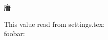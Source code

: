 \documentclass[a4paper,twoside]{book}
\begin{document}
{\mktsFontsDejavuserifregular\mktsSampletexten}\par
{\mktsFontsDejavuserifregular\mktsSampletextzh}\par
{\mktsFontsSunexta{}唐\mktsSampletextzh}\par
This value read from settings.tex: \\foobar: \foobar\par
\end{document}
